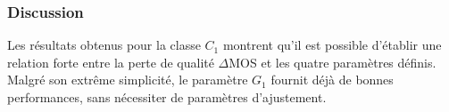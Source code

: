 \subsubsection{Discussion}
Les résultats obtenus pour la classe $C_1$ montrent qu'il est possible d'établir une relation forte entre la perte de qualité $\Delta$MOS et les quatre paramètres définis. Malgré son extrême simplicité, le paramètre $G_1$ fournit déjà de bonnes performances, sans nécessiter de paramètres d'ajustement. %


